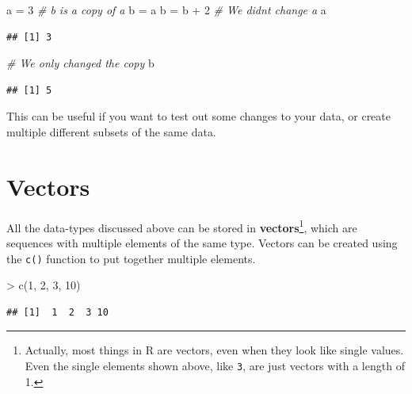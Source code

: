 \documentclass[
]{book}
\newenvironment{Shaded}{\begin{snugshade}}{\end{snugshade}}
\newcommand{\CommentTok}[1]{\textcolor[rgb]{0.56,0.35,0.01}{\textit{#1}}}
\newcommand{\DecValTok}[1]{\textcolor[rgb]{0.00,0.00,0.81}{#1}}
\newcommand{\FunctionTok}[1]{\textcolor[rgb]{0.00,0.00,0.00}{#1}}
\newcommand{\NormalTok}[1]{#1}
\newcommand{\OtherTok}[1]{\textcolor[rgb]{0.56,0.35,0.01}{#1}}
\newcommand{\SpecialCharTok}[1]{\textcolor[rgb]{0.00,0.00,0.00}{#1}}
\begin{document}
\begin{Shaded}
\begin{Highlighting}[]
\NormalTok{a }\OtherTok{=} \DecValTok{3}
\CommentTok{\# b is a copy of a}
\NormalTok{b }\OtherTok{=}\NormalTok{ a}
\NormalTok{b }\OtherTok{=}\NormalTok{ b }\SpecialCharTok{+} \DecValTok{2}
\CommentTok{\# We didn\textquotesingle{}t change a}
\NormalTok{a}
\end{Highlighting}
\end{Shaded}

\begin{verbatim}
## [1] 3
\end{verbatim}

\begin{Shaded}
\begin{Highlighting}[]
\CommentTok{\# We only changed the copy}
\NormalTok{b}
\end{Highlighting}
\end{Shaded}

\begin{verbatim}
## [1] 5
\end{verbatim}

This can be useful if you want to test out some changes to your data, or create
multiple different subsets of the same data.

\hypertarget{vectors}{%
\section{Vectors}\label{vectors}}

All the data-types discussed above can be stored in \textbf{vectors}\footnote{Actually, most things in R are vectors, even when they look like
  single values. Even the single elements shown above, like \texttt{3}, are just
  vectors with a length of 1.}, which
are sequences with multiple elements of the same type. Vectors can be
created using the \texttt{c()} function to put together multiple elements.

\begin{Shaded}
\begin{Highlighting}[]
\SpecialCharTok{\textgreater{}} \FunctionTok{c}\NormalTok{(}\DecValTok{1}\NormalTok{, }\DecValTok{2}\NormalTok{, }\DecValTok{3}\NormalTok{, }\DecValTok{10}\NormalTok{)}
\end{Highlighting}
\end{Shaded}

\begin{verbatim}
## [1]  1  2  3 10
\end{verbatim}
\end{document}
